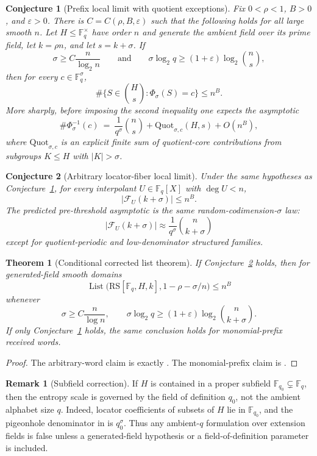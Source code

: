 \documentclass[11pt]{article}
\newtheorem{theorem}{Theorem}[section]
\newtheorem{conjecture}[conjecture]{Conjecture}
\theoremstyle{definition}
\newtheorem{remark}[remark]{Remark}
\newcommand{\F}{\mathbb F}
\newcommand{\eps}{\varepsilon}
\newcommand{\RS}{\mathrm{RS}}
\newcommand{\Lst}{\operatorname{List}}
\newcommand{\Fib}{\mathcal F}
\begin{document}
\begin{conjecture}[Prefix local limit with quotient exceptions]\label{conj:prefix-local}
Fix $0<\rho<1$, $B>0$, and $\eps>0$.  There is $C=C(\rho,B,\eps)$ such that the following holds for all large smooth $n$.  Let $H\le\F_q^\times$ have order $n$ and generate the ambient field over its prime field, let $k=\rho n$, and let $s=k+\sigma$.  If
\[
        \sigma\ge C\frac{n}{\log_2n}
        \qquad\text{and}\qquad
        \sigma\log_2q\ge (1+\eps)\log_2\binom ns,
\]
then for every $c\in\F_q^\sigma$,
\[
        \#\{S\in\binom Hs:\Phi_\sigma(S)=c\}\le n^B.
\]
More sharply, before imposing the second inequality one expects the asymptotic
\[
        \#\Phi_\sigma^{-1}(c)
        \ =\ \frac1{q^\sigma}\binom ns
              +\mathrm{Quot}_{\sigma,c}(H,s)
              +O(n^B),
\]
where $\mathrm{Quot}_{\sigma,c}$ is an explicit finite sum of quotient-core contributions from subgroups $K\le H$ with $|K|>\sigma$.
\end{conjecture}

\begin{conjecture}[Arbitrary locator-fiber local limit]\label{conj:arbitrary-local}
Under the same hypotheses as Conjecture~\ref{conj:prefix-local}, for every interpolant $U\in\F_q[X]$ with $\deg U<n$,
\[
        |\Fib_U(k+\sigma)|\le n^B.
\]
The predicted pre-threshold asymptotic is the same random-codimension-$\sigma$ law:
\[
        |\Fib_U(k+\sigma)|
        \approx \frac1{q^\sigma}\binom n{k+\sigma}
\]
except for quotient-periodic and low-denominator structured families.
\end{conjecture}

\begin{theorem}[Conditional corrected list theorem]\label{thm:conditional-list}
If Conjecture~\ref{conj:arbitrary-local} holds, then for generated-field smooth domains
\[
        \Lst\big(\RS[\F_q,H,k],1-\rho-\sigma/n\big)\le n^B
\]
whenever
\[
        \sigma\ge C\frac n{\log n},
        \qquad
        \sigma\log_2q\ge(1+\eps)\log_2\binom n{k+\sigma}.
\]
If only Conjecture~\ref{conj:prefix-local} holds, the same conclusion holds for monomial-prefix received words.
\end{theorem}

\begin{proof}
The arbitrary-word claim is exactly .  The monomial-prefix claim is .
\end{proof}

\begin{remark}[Subfield correction]\label{rem:subfield}
If $H$ is contained in a proper subfield $\F_{q_0}\subsetneq\F_q$, then the entropy scale is governed by the field of definition $q_0$, not the ambient alphabet size $q$.  Indeed, locator coefficients of subsets of $H$ lie in $\F_{q_0}$, and the pigeonhole denominator in  is $q_0^\sigma$.  Thus any ambient-$q$ formulation over extension fields is false unless a generated-field hypothesis or a field-of-definition parameter is included.
\end{remark}
\end{document}
